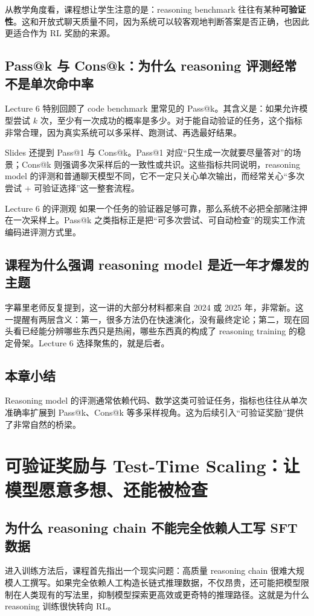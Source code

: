 \documentclass[a4paper]{article}
\begin{document}
从教学角度看，课程想让学生注意的是：reasoning benchmark 往往有某种\textbf{可验证性}。这和开放式聊天质量不同，因为系统可以较客观地判断答案是否正确，也因此更适合作为 RL 奖励的来源。

\subsection{Pass@k 与 Cons@k：为什么 reasoning 评测经常不是单次命中率}
Lecture 6 特别回顾了 code benchmark 里常见的 Pass@k。其含义是：如果允许模型尝试 $k$ 次，至少有一次成功的概率是多少。对于能自动验证的任务，这个指标非常合理，因为真实系统可以多采样、跑测试、再选最好结果。

Slides 还提到 Pass@1 与 Cons@k。Pass@1 对应“只生成一次就要尽量答对”的场景；Cons@k 则强调多次采样后的一致性或共识。这些指标共同说明，reasoning model 的评测和普通聊天模型不同，它不一定只关心单次输出，而经常关心“多次尝试 + 可验证选择”这一整套流程。

\begin{knowledgebox}{Lecture 6 的评测观}
如果一个任务的验证器足够可靠，那么系统不必把全部赌注押在一次采样上。Pass@k 之类指标正是把“可多次尝试、可自动检查”的现实工作流编码进评测方式里。
\end{knowledgebox}

\subsection{课程为什么强调 reasoning model 是近一年才爆发的主题}
字幕里老师反复提到，这一讲的大部分材料都来自 2024 或 2025 年，非常新。这一提醒有两层含义：第一，很多方法仍在快速演化，没有最终定论；第二，现在回头看已经能分辨哪些东西只是热闹，哪些东西真的构成了 reasoning training 的稳定骨架。Lecture 6 选择聚焦的，就是后者。

\subsection{本章小结}
Reasoning model 的评测通常依赖代码、数学这类可验证任务，指标也往往从单次准确率扩展到 Pass@k、Cons@k 等多采样视角。这为后续引入“可验证奖励”提供了非常自然的桥梁。

\section{可验证奖励与 Test-Time Scaling：让模型愿意多想、还能被检查}

\subsection{为什么 reasoning chain 不能完全依赖人工写 SFT 数据}
进入训练方法后，课程首先指出一个现实问题：高质量 reasoning chain 很难大规模人工撰写。如果完全依赖人工构造长链式推理数据，不仅昂贵，还可能把模型限制在人类现有的写法里，抑制模型探索更高效或更奇特的推理路径。这就是为什么 reasoning 训练很快转向 RL。
\end{document}
